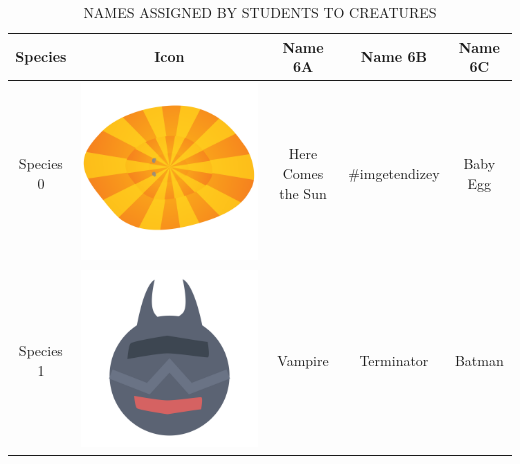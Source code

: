 \begin{table}
\centering
\caption{NAMES ASSIGNED BY STUDENTS TO CREATURES}
\begin{tabular}{ | c | c | c | c | c | }
\hline
Species   & Icon & Name 6A & Name 6B & Name 6C \\
\hline
Species 0  & \includegraphics[valign=m,scale=0.1]{images/species_00.png} & Here Comes the Sun & \#imgetendizey & Baby Egg \\ 
Species 1  & \includegraphics[valign=m,scale=0.1]{images/species_01.png} & Vampire & Terminator & Batman \\ 

\end{tabular}
\end{table}
